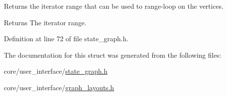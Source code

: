 Returns the iterator range that can be used to range-\/loop on the vertices. 

\begin{DoxyReturn}{Returns}
The iterator range. 
\end{DoxyReturn}


Definition at line 72 of file state\+\_\+graph.\+h.



The documentation for this struct was generated from the following files\+:\begin{DoxyCompactItemize}
\item 
core/user\+\_\+interface/\hyperlink{state__graph_8h}{state\+\_\+graph.\+h}\item 
core/user\+\_\+interface/\hyperlink{graph__layouts_8h}{graph\+\_\+layouts.\+h}\end{DoxyCompactItemize}
